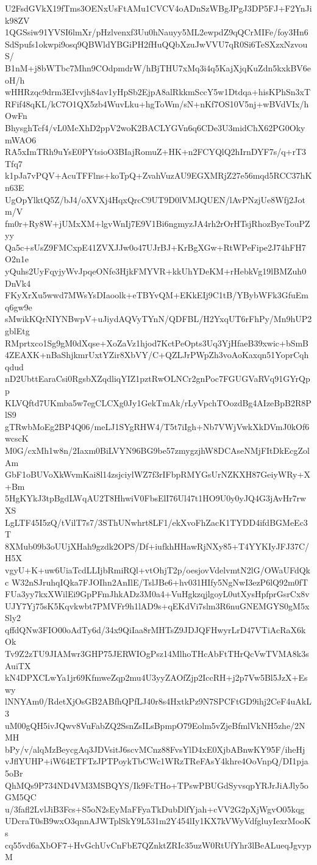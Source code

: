 U2FsdGVkX19fTms3OENxUsFtAMu1CVCV4oADnSzWBgJPgJ3DP5FJ+F2YnJik98ZV
1QGSsiw91YVSI6lmXr/pHzlvenxf3Uu0hNauyy5ML2ewpdZ9qQCrMIFe/foy3Hn6
SdSpufs1okwpi9osq9QBWldYBGiPH2fHuQQbXzuJwVVU7qR0Si6TeSXzxNzvouS/
B1nM+j8bWTbc7Mhn9COdpmdrW/hBjTHU7xMq3i4q5KajXjqKuZdn5kxkBV6eoH/h
wHHRzqc9drm3EIvvjh84av1yHpSb2EjpA8alRkkmSccY5w1Dtdqa+hisKPhSn3xT
RFif48qKL/kC7O1QX5zb4WuvLku+hgToWm/sN+nKf7OS10V5nj+wBVdVIx/hOwFn
BhysghTcf4/vL0McXhD2ppV2woK2BACLYGVn6q6CDe3U3midChX62PG0OkymWAO6
RA5xImTRh9uYsE0PYtsioO3BIajRomuZ+HK+n2FCYQlQ2hIrnDYF7s/q+rT3Tfq7
k1pJa7vPQV+AcuTFFlns+koTpQ+ZvahVuzAU9EGXMRjZ27e56mqd5RCC37hKn63E
UgOpYlktQ5Z/bJ4/oXVXj4HqxQrcC9UT9D0lVMJQUEN/lAvPNzjUe8Wfj2Jotm/V
fm0r+Ry8W+jUMxXM+lgvWnIj7E9V1Bi6ngmyzJA4rh2rOrHTsjRhozByeTouPZyy
Qa5c+sUsZ9FMCxpE41ZVXJJw0o47UJrBJ+KrBgXGw+RtWPeFipe2J74hFH7O2n1e
yQuhs2UyFqyjyWvJpqeONfe3HjkFMYVR+kkUhYDeKM+rHebkVg19lBMZuh0DnVk4
FKyXrXu5wwd7MWsYsDIaoolk+eTBYvQM+EKkEIj9C1tB/YBybWFk3GfuEmq6gw9e
sMwikKQrNIYNBwpV+uJiydAQVyTYnN/QDFBL/H2YxqUT6rFhPy/Mn9hUP2gblEtg
RMprtxco1Sg9gM0dXqse+XoZaVz1hjod7KctPeOpts3Uq3YjHfaeB39xwic+bSmB
4ZEAXK+nBaShjkmrUxtYZir8XbVY/C+QZLJrPWpZh3voAoKaxqn51YoprCqhqdud
nD2UbttEaraCsi0RgsbXZqdliqYIZ1pztRwOLNCr2gnPoc7FGUGVaRVq91GYrQpp
KLVQftd7UKmba5w7egCLCXg0Jy1GekTmAk/rLyVpchTOozdBg4AIzeBpB2R8PlS9
gTRwbMoEg2BP4Q06/meLJ1SYgRHW4/T5t7iIgh+Nb7VWjVwkXkDVmJ0kOf6wcscK
M0G/cxMh1w8n/2Iaxm0BiLVYN96BG9be57zmygzjhW8DCAseNMjFItDkEcgZolAm
GbF1oBUVoXkWvmKai8l14zsjciylWZ7f3rIFbpRMYGsUrNZKXH87GeiyWRy+X+Bm
5HgKYkJ3tpBgdLWqAU2T8HhwiV0FbsElI76Ul47t1HO9U0y0yJQ4G3jAvHr7rwXS
LgLTF45I5zQ/tVilT7s7/3SThUNwhrt8LF1/ekXvoFhZacK1TYDD4ifdBGMeEc3T
8XMub09b3oUUjXHah9gzdk2OPS/Df+iufkhHHawRjNXy85+T4YYKIyJFJ37C/H5X
vgyU+K+uw6UiaTcdLLIjbRmiRQl+vtOhjT2p/oesjovVdelvmtN2lG/OWaUFdQkc
W32nSJruhqIQka7FJOIhn2AnIlE/TslJBe6+hv031HIfy5NgNwI3ezP6lQ92m0fT
FUa3yy7kxXWilEi9GpPFmJhkADz3M0a4+VuHgkzqjlgoyL0utXysHpfprGsrCx8v
UJY7Yj75sK5Kqvkwbt7PMVFr9h1lAD9s+qEKdVi7slm3R6nuGNEMGYS0gM5xSly2
qffdQNw3FIO00oAdTy6d/34x9QiIaa8rMHTsZ9JDJQFHwyrLrD47VTiAcRaX6kOk
Tv9Z2zTU9JIAMwr3GHP75JERWIOgPsz14MlhoTHcAbFtTHrQcVwTVMA8k3sAuiTX
kN4DPXCLwYa1jr69KfmweZqp2mu4U3yyZAOfZjp2IccRH+j2p7Vw5Bl5JzX+Eswy
lNNYAm0/RdetXjOsGB2ABfhQPfLJ40r8s4HxtkPz9N7SPCFtGD9ihj2CeF4uAkL3
uM00gQH5ivJQwv8VuFabZQ2SsnZsILsBpmpO79Eolm5vZjeBfmlVkNH5zhe/2NMH
bPy/v/alqMzBeycgAq3JDVsitJ6scvMCnz88FvsYlD4xE0XjbABnwKY95F/iheHj
vJflYUHP+iW64ETFTzJPTPoykTbCWc1WRzTReFAsY4khre4OoVnpQ/DI1pja5oBr
QhMQs9P734ND4VM3MSBQYS/Ik9FcTHo+TPswPBUGdSyvsqpYRJrJiAJly5oGM5QC
u/3fafl2LvlJiB3Fcs+S5oN2sEyMaFFyaTkDubDlfYjah+cVV2G2pXjWgvO05kqg
UDcraT0sB9wxO3qnnAJWTplSkY9L531m2Y454lIy1KX7kVWyVdfgluyIexrMooKs
cq55vd6aXbOF7+HvGchUvCnFbE7QZnktZRIc35uzW0RtUfYhr3lBeALueqJgvypM

